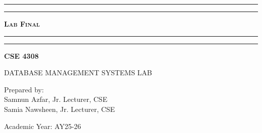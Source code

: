 \documentclass[12pt,a4paper]{article}
\begin{document}
\begin{titlepage}
    \centering
    \vspace*{2\baselineskip}

    \rule{14cm}{2pt}\vspace*{-0.8\baselineskip}\vspace*{1.5pt}
    \rule{14cm}{0.5pt}\vspace{2\baselineskip}

    {\Huge\bfseries\scshape Lab Final\par}
    \vspace{3mm}
    {\Large }
    \vspace{3mm}

    \rule{14cm}{0.5pt}\vspace*{-0.7\baselineskip}\vspace{2.5pt}
    \rule{14cm}{2pt}

    \vspace{2\baselineskip}

    {\Large\bfseries CSE 4308\par}
    \vspace{1\baselineskip}
    {\large DATABASE MANAGEMENT SYSTEMS LAB\par}

    \vfill
    {\normalsize Prepared by:\\ Samnun Azfar, Jr. Lecturer, CSE\\ Samia Nawsheen, Jr. Lecturer, CSE\par}
    {\normalsize Academic Year: AY25-26\par}
\end{titlepage}

\newpage
\newpage

\end{document}
